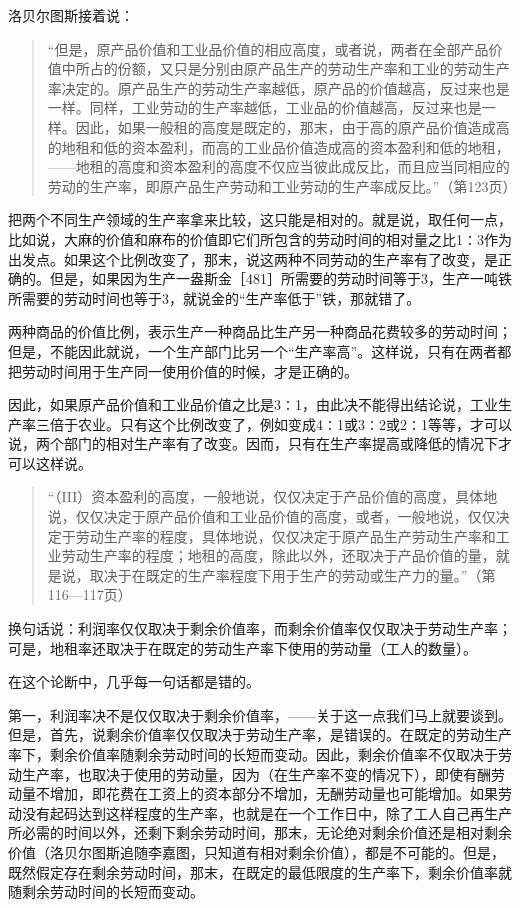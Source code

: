 洛贝尔图斯接着说：

\begin{quote}{“但是，原产品价值和工业品价值的相应高度，或者说，两者在全部产品价值中所占的份额，又只是分别由原产品生产的劳动生产率和工业的劳动生产率决定的。原产品生产的劳动生产率越低，原产品的价值越高，反过来也是一样。同样，工业劳动的生产率越低，工业品的价值越高，反过来也是一样。因此，如果一般租的高度是既定的，那末，由于高的原产品价值造成高的地租和低的资本盈利，而高的工业品价值造成高的资本盈利和低的地租，——地租的高度和资本盈利的高度不仅应当彼此成反比，而且应当同相应的劳动的生产率，即原产品生产劳动和工业劳动的生产率成反比。”（第123页）}\end{quote}

把两个不同生产领域的生产率拿来比较，这只能是相对的。就是说，取任何一点，比如说，大麻的价值和麻布的价值即它们所包含的劳动时间的相对量之比1∶3作为出发点。如果这个比例改变了，那末，说这两种不同劳动的生产率有了改变，是正确的。但是，如果因为生产一盎斯金［481］所需要的劳动时间等于3，生产一吨铁所需要的劳动时间也等于3，就说金的“生产率低于”铁，那就错了。

两种商品的价值比例，表示生产一种商品比生产另一种商品花费较多的劳动时间；但是，不能因此就说，一个生产部门比另一个“生产率高”。这样说，只有在两者都把劳动时间用于生产同一使用价值的时候，才是正确的。

因此，如果原产品价值和工业品价值之比是3∶1，由此决不能得出结论说，工业生产率三倍于农业。只有这个比例改变了，例如变成4∶1或3∶2或2∶1等等，才可以说，两个部门的相对生产率有了改变。因而，只有在生产率提高或降低的情况下才可以这样说。


\begin{quote}{“（III）资本盈利的高度，一般地说，仅仅决定于产品价值的高度，具体地说，仅仅决定于原产品价值和工业品价值的高度，或者，一般地说，仅仅决定于劳动生产率的程度，具体地说，仅仅决定于原产品生产劳动生产率和工业劳动生产率的程度；地租的高度，除此以外，还取决于产品价值的量，就是说，取决于在既定的生产率程度下用于生产的劳动或生产力的量。”（第116—117页）}\end{quote}

换句话说：利润率仅仅取决于剩余价值率，而剩余价值率仅仅取决于劳动生产率；可是，地租率还取决于在既定的劳动生产率下使用的劳动量（工人的数量）。

在这个论断中，几乎每一句话都是错的。

第一，利润率决不是仅仅取决于剩余价值率，——关于这一点我们马上就要谈到。但是，首先，说剩余价值率仅仅取决于劳动生产率，是错误的。在既定的劳动生产率下，剩余价值率随剩余劳动时间的长短而变动。因此，剩余价值率不仅取决于劳动生产率，也取决于使用的劳动量，因为（在生产率不变的情况下），即使有酬劳动量不增加，即花费在工资上的资本部分不增加，无酬劳动量也可能增加。如果劳动没有起码达到这样程度的生产率，也就是在一个工作日中，除了工人自己再生产所必需的时间以外，还剩下剩余劳动时间，那末，无论绝对剩余价值还是相对剩余价值（洛贝尔图斯追随李嘉图，只知道有相对剩余价值），都是不可能的。但是，既然假定存在剩余劳动时间，那末，在既定的最低限度的生产率下，剩余价值率就随剩余劳动时间的长短而变动。

